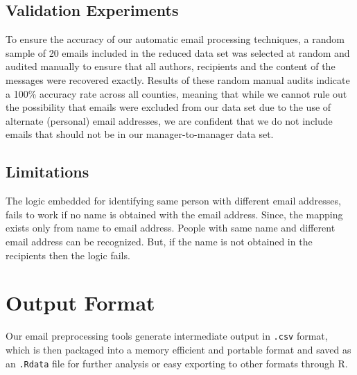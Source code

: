 \documentclass[fleqn]{MJDArticle}
\begin{document}
 




\subsection{Validation Experiments}


To ensure the accuracy of our automatic email processing techniques, a random sample of 20 emails included in the reduced data set was selected at random and audited manually to ensure that all authors, recipients and the content of the messages were recovered exactly. Results of these random manual audits indicate a 100\% accuracy rate across all counties, meaning that while we cannot rule out the possibility that emails were excluded from our data set due to the use of alternate (personal) email addresses, we are confident that we do not include emails that should not be in our manager-to-manager data set.

\subsection{Limitations}
The logic embedded for identifying same person with different email addresses, fails to work if no name is obtained with the email address. Since, the mapping exists only from name to email address. People with same name and different email address can be recognized. But, if the name is not obtained in the recipients then the logic fails. 


\section{Output Format}


Our email preprocessing tools generate intermediate output in \texttt{.csv} format, which is then packaged into a memory efficient and portable format and saved as an \texttt{.Rdata} file for further analysis or easy exporting to other formats through R. 
\end{document}
